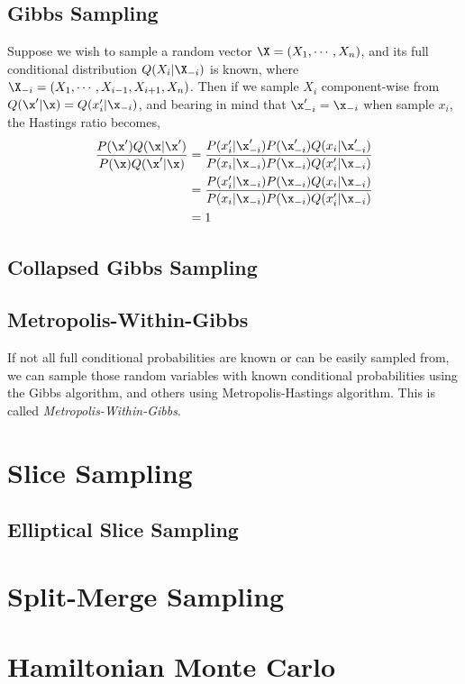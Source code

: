 \subsection{Gibbs Sampling}
Suppose we wish to sample a random vector $\X = (X_1,\cdots,X_n)$, and its full conditional distribution $Q(X_i|\X_{-i})$ is known, where $\X_{-i} = (X_1,\cdots,X_{i-1},X_{i+1},X_n)$. Then if we sample $X_i$ component-wise from $Q(\x'|\x) = Q(x_i'|\x_{-i})$, and bearing in mind that $\x'_{-i} = \x_{-i}$ when sample $x_i$, the Hastings ratio becomes,
\begin{align}
	\frac{P(\x')Q(\x|\x')}{P(\x)Q(\x'|\x)} &= \frac{P(x_i'|\x'_{-i})P(\x'_{-i})Q(x_i|\x'_{-i})}{P(x_i|\x_{-i})P(\x_{-i})Q(x_i'|\x_{-i})}\\
	&= \frac{P(x_i'|\x_{-i})P(\x_{-i})Q(x_i|\x_{-i})}{P(x_i|\x_{-i})P(\x_{-i})Q(x_i'|\x_{-i})}\\	
	&= 1
\end{align}

\subsection{Collapsed Gibbs Sampling}

\subsection{Metropolis-Within-Gibbs}
If not all full conditional probabilities are known or can be easily sampled from, we can sample those random variables with known conditional probabilities using the Gibbs algorithm, and others using Metropolis-Hastings algorithm. This is called {\em{Metropolis-Within-Gibbs}}.

\section{Slice Sampling}
\subsection{Elliptical Slice Sampling}

\section{Split-Merge Sampling}

\section{Hamiltonian Monte Carlo}


